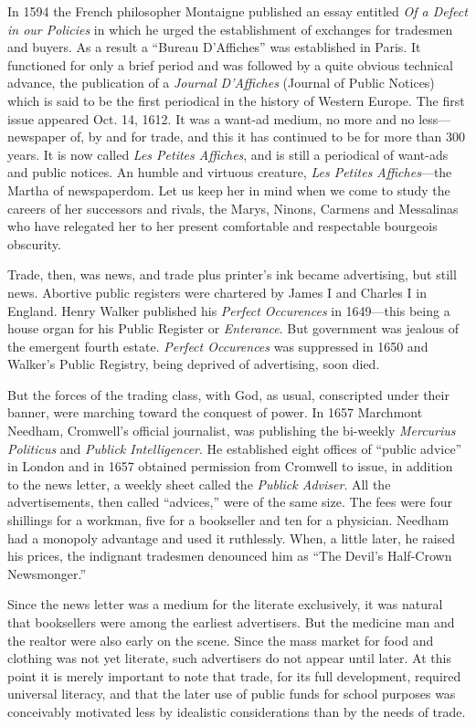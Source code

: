 \documentclass[nohyper,openany,nobib]{tufte-book}
\begin{document}
In 1594 the French philosopher Montaigne published an essay entitled
\emph{Of a Defect in our Policies} in which he urged the establishment
of exchanges for tradesmen and buyers. As a result a ``Bureau
D'Affiches'' was established in Paris. It functioned for only a brief
period and was followed by a quite obvious technical advance, the
publication of a \emph{Journal D'Affiches} (Journal of Public Notices)
which is said to be the first periodical in the history of Western
Europe. The first issue appeared Oct. 14, 1612. It was a want-ad medium,
no more and no less---newspaper of, by and for trade, and this it has
continued to be for more than 300 years. It is now called \emph{Les
Petites Affiches}, and is still a periodical of want-ads and public
notices. An humble and virtuous creature, \emph{Les Petites
Affiches}---the Martha of newspaperdom. Let us keep her in mind when we
come to study the careers of her successors and rivals, the Marys,
Ninons, Carmens and Messalinas who have relegated her to her present
comfortable and respectable bourgeois obscurity.

Trade, then, was news, and trade plus printer's ink became advertising,
but still news. Abortive public registers were chartered by James I and
Charles I in England. Henry Walker published his \emph{Perfect
Occurences} in 1649---this being a house organ for his Public Register
or \emph{Enterance}. But government was jealous of the emergent fourth
estate. \emph{Perfect Occurences} was suppressed in 1650 and Walker's
Public Registry, being deprived of advertising, soon died.

But the forces of the trading class, with God, as usual, conscripted
under their banner, were marching toward the conquest of power. In 1657
Marchmont Needham, Cromwell's official journalist, was publishing the
bi-weekly \emph{Mercurius Politicus} and \emph{Publick Intelligencer}.
He established eight offices of ``public advice'' in London and in 1657
obtained permission from Cromwell to issue, in addition to the news
letter, a weekly sheet called the \emph{Publick Adviser}. All the
advertisements, then called ``advices,'' were of the same size. The fees
were four shillings for a workman, five for a bookseller and ten for a
physician. Needham had a monopoly advantage and used it ruthlessly.
When, a little later, he raised his prices, the indignant tradesmen
denounced him as ``The Devil's Half-Crown Newsmonger.''

Since the news letter was a medium for the literate exclusively, it was
natural that booksellers were among the earliest advertisers. But the
medicine man and the realtor were also early on the scene. Since the
mass market for food and clothing was not yet literate, such advertisers
do not appear until later. At this point it is merely important to note
that trade, for its full development, required universal literacy, and
that the later use of public funds for school purposes was conceivably
motivated less by idealistic considerations than by the needs of trade.
\end{document}

